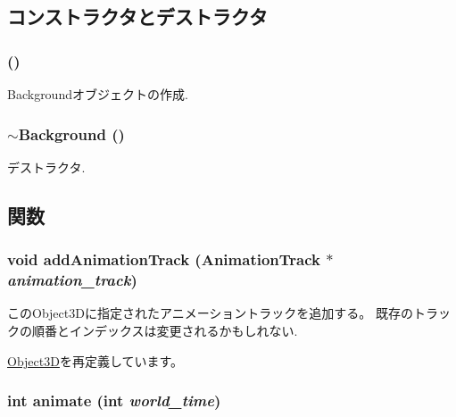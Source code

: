 \subsection{コンストラクタとデストラクタ}
\hypertarget{classm3g_1_1Background_2bbc220bb63956558a8603a7909c2bbd}{
\subsubsection[{Background}]{ ()}}
\label{classm3g_1_1Background_2bbc220bb63956558a8603a7909c2bbd}


Backgroundオブジェクトの作成. \hypertarget{classm3g_1_1Background_b793cb50870532320856acdd2caf84c3}{
\subsubsection[{$\sim$Background}]{\setlength{\rightskip}{0pt plus 5cm}$\sim${\bf Background} ()}}
\label{classm3g_1_1Background_b793cb50870532320856acdd2caf84c3}


デストラクタ. 

\subsection{関数}
\hypertarget{classm3g_1_1Background_415c0b110f95410ded9b85e5d99a496b}{
\subsubsection[{addAnimationTrack}]{\setlength{\rightskip}{0pt plus 5cm}void addAnimationTrack ({\bf AnimationTrack} $\ast$ {\em animation\_\-track})}}
\label{classm3g_1_1Background_415c0b110f95410ded9b85e5d99a496b}


このObject3Dに指定されたアニメーショントラックを追加する。 既存のトラックの順番とインデックスは変更されるかもしれない. 

\hyperlink{classm3g_1_1Object3D_415c0b110f95410ded9b85e5d99a496b}{Object3D}を再定義しています。\hypertarget{classm3g_1_1Background_8aad1ceab4c2a03609c8a42324ce484d}{
\subsubsection[{animate}]{\setlength{\rightskip}{0pt plus 5cm}int animate (int {\em world\_\-time})}}
\label{classm3g_1_1Background_8aad1ceab4c2a03609c8a42324ce484d}


